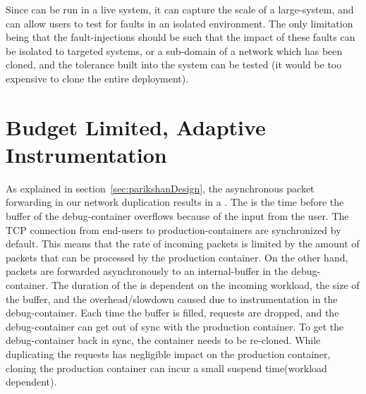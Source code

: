 Since \parikshan can be run in a live system, it can capture the scale of a large-system, and can allow users to test for faults in an isolated environment.
The only limitation being that the fault-injections should be such that the impact of these faults can be isolated to targeted systems, or a sub-domain of a network which has been cloned, and the tolerance built into the system can be tested (it would be too expensive to clone the entire deployment).


\section{Budget Limited, Adaptive Instrumentation}
\label{sec:activeBudgetLimited}

As explained in section~\ref{sec:parikshanDesign}, the asynchronous packet forwarding in our network duplication results in a \debugwindow.
The \debugwindow is the time before the buffer of the debug-container overflows because of the input from the user.
The TCP connection from end-users to production-containers are synchronized by default.
This means that the rate of incoming packets is limited by the amount of packets that can be processed by the production container.
On the other hand, packets are forwarded asynchronously to an internal-buffer in the debug-container.
The duration of the \debugwindow is dependent on the incoming workload, the size of the buffer, and the overhead/slowdown caused due to instrumentation in the debug-container.
Each time the buffer is filled, requests are dropped, and the debug-container can get out of sync with the production container.
To get the debug-container back in sync, the container needs to be re-cloned.
While duplicating the requests has negligible impact on the production container, cloning the production container can incur a small suspend time(workload dependent).

